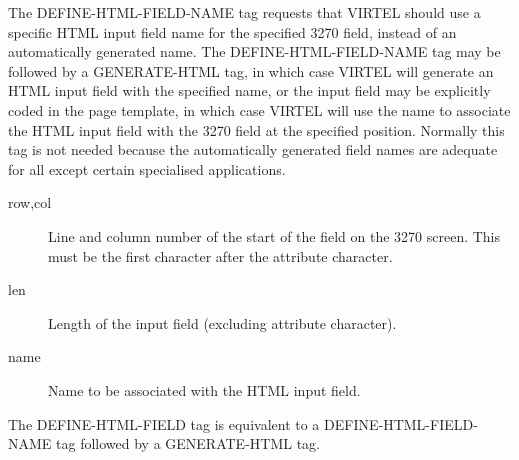 \documentclass[letterpaper,10pt,english]{sphinxmanual}
\begin{document}

The DEFINE-HTML-FIELD-NAME tag requests that VIRTEL should use a specific HTML input field name for the specified
3270 field, instead of an automatically generated name. The DEFINE-HTML-FIELD-NAME tag may be followed by a
GENERATE-HTML tag, in which case VIRTEL will generate an HTML input field with the specified name, or the input
field may be explicitly coded in the page template, in which case VIRTEL will use the name to associate the HTML input
field with the 3270 field at the specified position. Normally this tag is not needed because the automatically generated
field names are adequate for all except certain specialised applications.

\begin{sphinxVerbatim}[commandchars=\\\{\}]
     
\end{sphinxVerbatim}
\begin{description}
\item[{row,col}] \leavevmode
Line and column number of the start of the field on the 3270 screen. This must be the first character after the attribute character.

\item[{len}] \leavevmode
Length of the input field (excluding attribute character).

\item[{name}] \leavevmode
Name to be associated with the HTML input field.

\end{description}


The DEFINE-HTML-FIELD tag is equivalent to a DEFINE-HTML-FIELD-NAME tag followed by a GENERATE-HTML tag.
\end{document}
